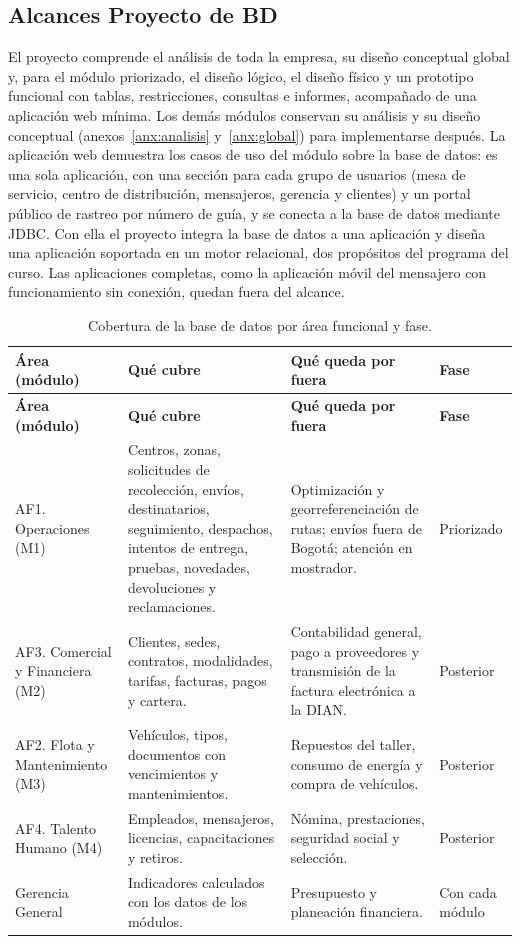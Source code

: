 \subsection{Alcances Proyecto de BD}

El proyecto comprende el análisis de toda la empresa, su diseño
conceptual global y, para el módulo priorizado, el diseño lógico, el
diseño físico y un prototipo funcional con tablas, restricciones,
consultas e informes, acompañado de una aplicación web mínima. Los demás
módulos conservan su análisis y su diseño conceptual
(anexos~\ref{anx:analisis} y~\ref{anx:global}) para implementarse
después. La aplicación web demuestra los casos de uso del módulo sobre la
base de datos: es una sola aplicación, con una sección para cada grupo de
usuarios (mesa de servicio, centro de distribución, mensajeros,
gerencia y clientes) y un portal público de rastreo por número de guía, y
se conecta a la base de datos mediante JDBC. Con ella el proyecto
integra la base de datos a una aplicación y diseña una aplicación
soportada en un motor relacional, dos propósitos del programa del curso.
Las aplicaciones completas, como la aplicación móvil del mensajero con
funcionamiento sin conexión, quedan fuera del alcance.

{\singlespacing\small
\begin{longtable}{L{2.9cm} L{5.0cm} L{4.3cm} L{1.7cm}}
\caption{Cobertura de la base de datos por área funcional y fase.}
\label{tab:alcanceareas}\\
\toprule
\textbf{Área (módulo)} & \textbf{Qué cubre} & \textbf{Qué queda por fuera} & \textbf{Fase} \\
\midrule
\endfirsthead
\toprule
\textbf{Área (módulo)} & \textbf{Qué cubre} & \textbf{Qué queda por fuera} & \textbf{Fase} \\
\midrule
\endhead
\bottomrule
\endfoot
AF1. Operaciones (M1) & Centros, zonas, solicitudes de recolección, envíos, destinatarios, seguimiento, despachos, intentos de entrega, pruebas, novedades, devoluciones y reclamaciones. & Optimización y georreferenciación de rutas; envíos fuera de Bogotá; atención en mostrador. & Priorizado \\
\midrule
AF3. Comercial y Financiera (M2) & Clientes, sedes, contratos, modalidades, tarifas, facturas, pagos y cartera. & Contabilidad general, pago a proveedores y transmisión de la factura electrónica a la DIAN. & Posterior \\
\midrule
AF2. Flota y Mantenimiento (M3) & Vehículos, tipos, documentos con vencimientos y mantenimientos. & Repuestos del taller, consumo de energía y compra de vehículos. & Posterior \\
\midrule
AF4. Talento Humano (M4) & Empleados, mensajeros, licencias, capacitaciones y retiros. & Nómina, prestaciones, seguridad social y selección. & Posterior \\
\midrule
Gerencia General & Indicadores calculados con los datos de los módulos. & Presupuesto y planeación financiera. & Con cada módulo \\
\end{longtable}
\par}

